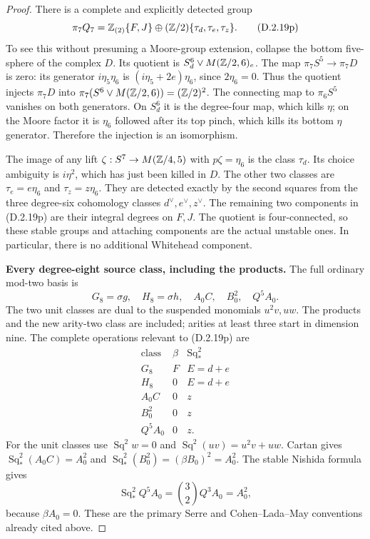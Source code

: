 \begin{proof}
There is a complete and explicitly detected group
\[
 \pi_7Q_7=
 \mathbb Z_{(2)}\{F,J\}\oplus(\mathbb Z/2)\{\tau_d,\tau_e,\tau_z\}.
 \tag{D.2.19p}
\]
To see this without presuming a Moore-group extension,
collapse the bottom five-sphere of the complex $D$.
Its quotient is $S^6_d\vee M(\mathbb Z/2,6)_e$.
The map $\pi_7S^5\to\pi_7D$ is zero: its generator
$i\eta_5\eta_6$ is
$(i\eta_5+2e)\eta_6$, since $2\eta_6=0$.
Thus the quotient injects $\pi_7D$ into
$\pi_7(S^6\vee M(\mathbb Z/2,6))=(\mathbb Z/2)^2$.
The connecting map to $\pi_6S^5$ vanishes on both generators.
On $S^6_d$ it is the degree-four map, which kills $\eta$;
on the Moore factor it is $\eta_6$ followed after its top
pinch, which kills its bottom $\eta$ generator. Therefore
the injection is an isomorphism.

The image of any lift
$\zeta:S^7\to M(\mathbb Z/4,5)$ with $p\zeta=\eta_6$
is the class $\tau_d$. Its choice ambiguity is $i\eta^2$,
which has just been killed in $D$.
The other two classes are
$\tau_e=e\eta_6$ and $\tau_z=z\eta_6$.
They are detected exactly by the second squares from the
three degree-six cohomology classes $d^\vee,e^\vee,z^\vee$.
The remaining two components in \textup{(D.2.19p)} are
their integral degrees on $F,J$.
The quotient is four-connected, so these stable groups and
attaching components are the actual unstable ones. In
particular, there is no additional Whitehead component.

\medskip\noindent
\textbf{Every degree-eight source class, including the products.}
The full ordinary mod-two basis is
\[
 G_8=\sigma g,\quad H_8=\sigma h,\quad
 A_0C,\quad B_0^2,\quad Q^5A_0.
 \tag{D.2.19q}
\]
The two unit classes are dual to the suspended monomials
$u^2v,uw$. The products and the new arity-two class are
included; arities at least three start in dimension nine.
The complete operations relevant to
\textup{(D.2.19p)} are
\[
\begin{array}{c|c|c}
 \text{class}&\beta&\operatorname{Sq}_*^2\\ \hline
 G_8&F&E=d+e\\
 H_8&0&E=d+e\\
 A_0C&0&z\\
 B_0^2&0&z\\
 Q^5A_0&0&z.
\end{array}
 \tag{D.2.19r}
\]
For the unit classes use
$\operatorname{Sq}^2w=0$ and
$\operatorname{Sq}^2(uv)=u^2v+uw$.
Cartan gives
$\operatorname{Sq}_*^2(A_0C)=A_0^2$ and
$\operatorname{Sq}_*^2(B_0^2)=(\beta B_0)^2=A_0^2$.
The stable Nishida formula gives
\[
 \operatorname{Sq}_*^2Q^5A_0
   =\binom{3}{2}Q^3A_0=A_0^2,
 \tag{D.2.19s}
\]
because $\beta A_0=0$. These are the primary Serre and
Cohen--Lada--May conventions already cited above.


\end{proof}
